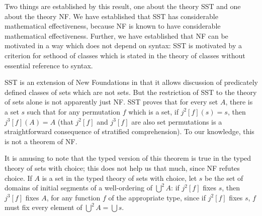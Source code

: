 \documentclass[12pt]{article}
\begin{document}
Two things are established by this result, one about the theory SST and one about the theory NF.  We have established that SST has considerable mathematical effectiveness, because NF is known to have considerable mathematical effectiveness.  Further, we have established that NF can be motivated in a way which does not depend on syntax:  SST is motivated by a criterion for sethood of classes which is stated in the theory of classes without essential reference to syntax.

SST is an extension of New Foundations in that it allows discussion of predicately defined classes of sets which are not
sets.  But the restriction of SST to the theory of sets alone is not apparently just NF.  SST proves that for every set $A$,
there is a set $s$ such that for any permutation $f$ which is a set, if $j^2[f](s)=s$, then $j^3[f](A)=A$ (that $j^2[f]$
and $j^3[f]$ are also set permutations is a straightforward consequence of stratified comprehension).  To our knowledge, this is not a theorem of NF.  

It is amusing to note that the typed version of this theorem is true
in the typed theory of sets with choice;  this does not help us that much, since NF refutes choice.  If $A$ is a set
in the typed theory of sets with choice, let $s$ be the set of domains of initial segments of a well-ordering of
$\bigcup^2 A$:  if $j^2[f]$ fixes $s$, then $j^3[f]$ fixes $A$, for any function $f$ of the appropriate type, since
if $j^2[f]$ fixes $s$, $f$ must fix every element of $\bigcup^2 A = \bigcup s$.
\end{document}
